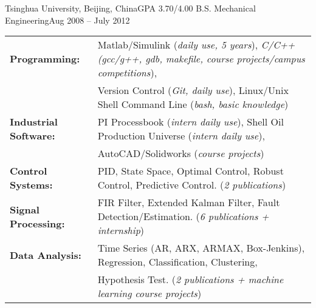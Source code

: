 \documentclass[10pt,a4paper]{article}
\begin{document}
\headedsection
{Tsinghua University, Beijing, China}{GPA 3.70/4.00}{
	\headedsubsection
  {B.S. Mechanical Engineering}{Aug 2008 -- July 2012}{}
}

\spacedhrule{0.5em}{-0.8em}
\small{
\begin{tabular}{ll}
  
  {\normalsize{\textbf{Programming: }}} & Matlab/Simulink (\textit{daily use, 5 years}), \textit{C/C++ (gcc/g++, gdb, makefile, course projects/campus competitions}),\\
                                        & Version Control (\textit{Git, daily use}), Linux/Unix Shell Command Line (\textit{bash, basic knowledge})\\
  
  {\normalsize \textbf{Industrial Software: }} & PI Processbook (\textit{intern daily use}),
                                                 Shell Oil Production Universe (\textit{intern daily use}),\\
                                        & AutoCAD/Solidworks (\textit{course projects})\\

  {\normalsize{\textbf{Control Systems: }}} & PID, State Space, Optimal Control, Robust Control, Predictive Control. (\textit{2 publications})\\

  {\normalsize{\textbf{Signal Processing: }}} & FIR Filter, Extended Kalman Filter, Fault Detection/Estimation. (\textit{6 publications + internship})\\

  {\normalsize{\textbf{Data Analysis: }}} & Time Series (AR, ARX, ARMAX, Box-Jenkins), Regression, Classification, Clustering,\\
  & Hypothesis Test. (\textit{2 publications + machine learning course projects})
\end{tabular}
}
\end{document}

